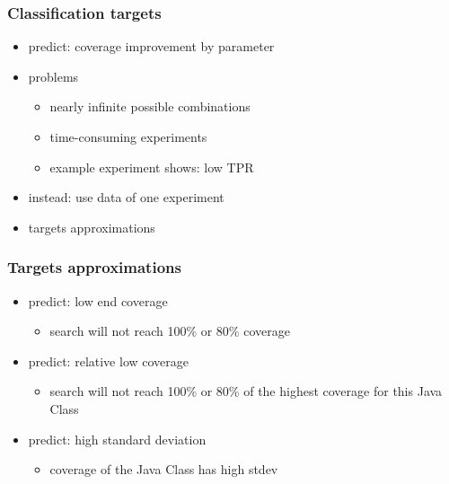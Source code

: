 \begin{frame}
	\frametitle{Classification targets}
	
	\begin{itemize}
		\item predict: coverage improvement by parameter
		\item problems
		\begin{itemize}
			\item nearly infinite possible combinations
			\item time-consuming experiments
			\item example experiment shows: low TPR
		\end{itemize}
		\item instead: use data of one experiment
		\item targets approximations
	\end{itemize}
	
\end{frame}

\begin{frame}
	\frametitle{Targets approximations}
	
	\begin{itemize}
		\item predict: low end coverage
		\begin{itemize}
			\item search will not reach 100\% or 80\% coverage
		\end{itemize}

		\item predict: relative low coverage
		\begin{itemize}
			\item search will not reach 100\% or 80\% of the highest coverage for this Java Class
		\end{itemize}		
		
		\item predict: high standard deviation
		\begin{itemize}
			\item coverage of the Java Class has high stdev
		\end{itemize}
	\end{itemize}
	
\end{frame}